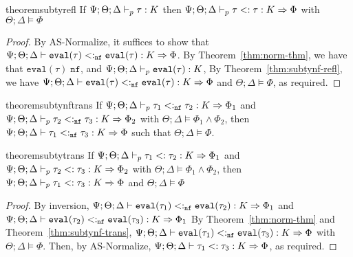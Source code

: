 \begin{restatable}{theorem}{subtyrefl}
If $\Psi ; \Theta ;  \Delta \vdash_p \tau : K$ then $\Psi ; \Theta ;  \Delta \vdash_p \tau<: \tau : K \Rightarrow \Phi$ with $\Theta ; \Delta \vDash \Phi$
\label{thm:subty-refl}
\end{restatable}
\begin{proof}
By AS-Normalize, it suffices to show that $\Psi ; \Theta ;  \Delta \vdash \texttt{eval}(\tau) <:_{\texttt{nf}} \texttt{eval}(\tau) : K \Rightarrow \Phi$. By Theorem~\ref{thm:norm-thm}, we have that $\texttt{eval}(\tau) \; \texttt{nf}$, and $\Psi ; \Theta ; \Delta \vdash_p \texttt{eval}(\tau) : K$, By Theorem~\ref{thm:subtynf-refl}, we have $\Psi ; \Theta ;  \Delta \vdash \texttt{eval}(\tau) <:_{\texttt{nf}} \texttt{eval}(\tau) : K \Rightarrow \Phi$ and $\Theta ; \Delta \vDash \Phi$, as required. 
\end{proof}

\begin{restatable}{theorem}{subtynftrans}
If $\Psi ; \Theta ; \Delta \vdash_p \tau_1 <:_{\texttt{nf}} \tau_2 : K \Rightarrow \Phi_1$ and $\Psi ; \Theta ; \Delta \vdash_p \tau_2 <:_{\texttt{nf}} \tau_3 : K \Rightarrow \Phi_2$ with $\Theta ; \Delta \vDash \Phi_1 \wedge \Phi_2$, then $\Psi ; \Theta ; \Delta \vdash \tau_1 <:_{\texttt{nf}} \tau_3 : K \Rightarrow \Phi$ such that $\Theta ; \Delta \vDash \Phi$.
\label{thm:subtynf-trans}
\end{restatable}

\begin{restatable}{theorem}{subtytrans}
\label{thm:subty-trans}
If $\Psi ; \Theta ; \Delta \vdash_p \tau_1 <: \tau_2 : K \Rightarrow \Phi_1$ and $\Psi ; \Theta ; \Delta \vdash_p \tau_2 <: \tau_3 : K \Rightarrow \Phi_2$ with $\Theta ; \Delta \vDash \Phi_1 \wedge \Phi_2$, then $\Psi ; \Theta ; \Delta \vdash_p \tau_1 <: \tau_3 : K \Rightarrow \Phi$ and $\Theta ; \Delta \vDash \Phi$
\end{restatable}
\begin{proof}
By inversion, $\Psi ; \Theta ; \Delta \vdash \texttt{eval}(\tau_1) <:_{\texttt{nf}} \texttt{eval}(\tau_2) : K \Rightarrow \Phi_1$ and $\Psi ; \Theta ; \Delta \vdash \texttt{eval}(\tau_2) <:_{\texttt{nf}} \texttt{eval}(\tau_3) : K \Rightarrow \Phi_1$ By Theorem~\ref{thm:norm-thm} and Theorem~\ref{thm:subtynf-trans}, 
$\Psi ; \Theta ; \Delta \vdash \texttt{eval}(\tau_1) <:_{\texttt{nf}} \texttt{eval}(\tau_3) : K \Rightarrow \Phi$ with $\Theta ; \Delta \vDash \Phi$. Then, by AS-Normalize,
$\Psi ; \Theta ; \Delta \vdash \tau_1 <: \tau_3 : K \Rightarrow \Phi$, as required.
\end{proof}


